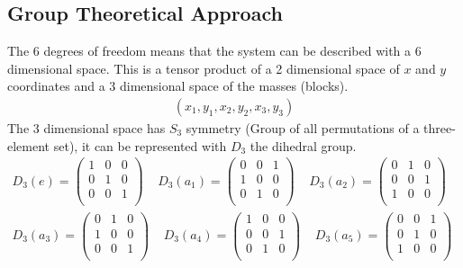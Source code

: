 \documentclass[a4paper]{article}
\theoremstyle{definition}
\theoremstyle{definition}
\theoremstyle{definition}
\theoremstyle{theorem}
\theoremstyle{theorem}
\theoremstyle{definition}
\begin{document}
\subsection{Group Theoretical Approach}
The 6 degrees of freedom means that the system can be described with a 6 dimensional space.
This is a tensor product of a 2 dimensional space of $x$ and $y$ coordinates and a 3 dimensional
space of the masses (blocks).
\begin{align*}
    (x_1, y_1, x_2, y_2,x_3, y_3)
\end{align*}
The 3 dimensional space has $S_3$ symmetry (Group of all permutations of a three-element set),
it can be represented with $D_3$ the dihedral group.
\begin{align*}
    D_3(e) =
    \begin{pmatrix}
        1 & 0 & 0 \\
        0 & 1 & 0 \\
        0 & 0 & 1 \\
    \end{pmatrix} \;\;\;\;
    D_3(a_1) = \begin{pmatrix}
        0 & 0 & 1 \\
        1 & 0 & 0 \\
        0 & 1 & 0 \\
    \end{pmatrix} \;\;\;\;
    D_3(a_2) =
    \begin{pmatrix}
        0 & 1 & 0 \\
        0 & 0 & 1 \\
        1 & 0 & 0 \\
    \end{pmatrix} \;\;\;\; \\
    D_3(a_3) =
    \begin{pmatrix}
        0 & 1 & 0 \\
        1 & 0 & 0 \\
        0 & 0 & 1 \\
    \end{pmatrix} \;\;\;\;
    D_3(a_4) = \begin{pmatrix}
        1 & 0 & 0 \\
        0 & 0 & 1 \\
        0 & 1 & 0 \\
    \end{pmatrix} \;\;\;\;
    D_3(a_5) =
    \begin{pmatrix}
        0 & 0 & 1 \\
        0 & 1 & 0 \\
        1 & 0 & 0 \\
    \end{pmatrix} \;\;\;\;
\end{align*}
\end{document}
